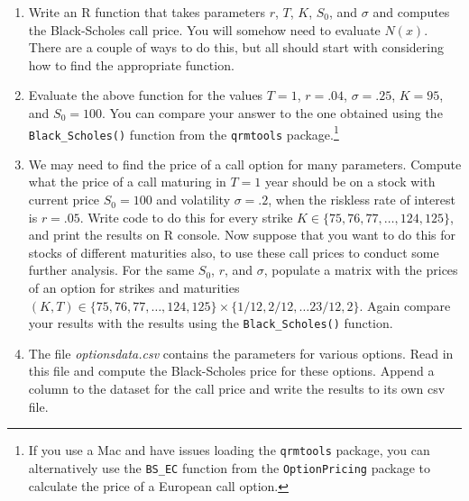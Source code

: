 \documentclass[12pt]{article}
\begin{document}
\begin{enumerate}
\item Write an R function that takes parameters $r$, $T$, $K$,
  $S_0$, and $\sigma$ and computes the Black-Scholes call price. You
  will somehow need to evaluate $N(x)$. There are a couple of ways
  to do this, but all should start with considering how to find the
  appropriate function.
\item Evaluate the above function for the values $T=1$, $r=.04$,
  $\sigma=.25$, $K=95$, and $S_0 = 100$. You can compare your answer
  to the one obtained using the \texttt{Black\_Scholes()} function from 
  the \texttt{qrmtools} package.\footnote{ If you use a Mac and have issues 
  loading the \texttt{qrmtools} package, you can alternatively use the \texttt{BS\_EC} 
  function from the \texttt{OptionPricing} package to calculate the price of a European call option.} 
\item We may need to find the price of a call option for many parameters.  Compute
  what the price of a call maturing in $T = 1$ year should be on a
  stock with current price $S_0 = 100$ and volatility $\sigma = .2$,
  when the riskless rate of interest is $r = .05$. Write code to do
  this for every strike $K \in \{75, 76, 77, \ldots, 124, 125\}$, and
  print the results on R console.  Now suppose that you want to do
  this for stocks of different maturities also, to
  use these call prices to conduct some further analysis. For the same
  $S_0$, $r$, and $\sigma$, populate a matrix with the prices of an
  option for strikes and maturities $(K,T) \in \{75, 76, 77, \ldots,
  124, 125\} \times \{1/12, 2/12, \ldots 23/12, 2\}$. Again compare
  your results with the results using the \texttt{Black\_Scholes()} function.
\item The file \emph{optionsdata.csv} contains the parameters for various
options. Read in this file and compute the Black-Scholes price for
these options. Append a column to the dataset for the call price and write the results
to its own csv file.
\end{enumerate}
\newpage
 
\end{document}
